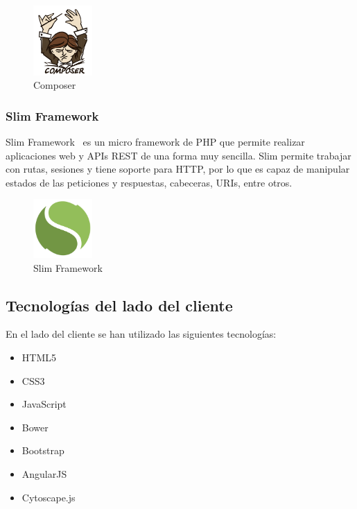 \begin{figure}[tbh]
\centering
\label{fig:composer}
\includegraphics[width=0.2\textwidth]{imagenes/composer}
\caption{Composer}
\end{figure}

\subsubsection*{Slim Framework}

Slim Framework~\cite{slim} es un micro framework de PHP que permite realizar aplicaciones web y APIs REST de una forma muy sencilla. Slim permite trabajar con rutas, sesiones y tiene soporte para HTTP, por lo que es capaz de manipular estados de las peticiones y respuestas, cabeceras, URIs, entre otros. 

\begin{figure}[tbh]
\centering
\label{fig:slim}
\includegraphics[width=0.2\textwidth]{imagenes/slim}
\caption{Slim Framework}
\end{figure}

\subsection{Tecnologías del lado del cliente}

En el lado del cliente se han utilizado las siguientes tecnologías:

\begin{itemize}
\item HTML5
\item CSS3
\item JavaScript
\item Bower
\item Bootstrap
\item AngularJS
\item Cytoscape.js
\end{itemize}

